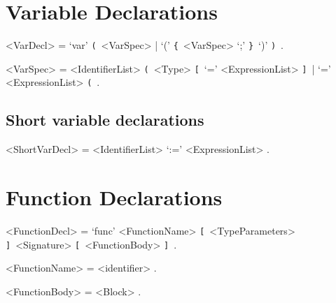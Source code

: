 \documentclass{article}
\def\lrep{\synshortsoff\texttt{\{}\synshorts~}
\def\rrep{\synshortsoff\texttt{\}}\synshorts~}
\def\lopt{\synshortsoff\texttt{[}\synshorts~}
\def\ropt{\synshortsoff\texttt{]}\synshorts~}
\def\lgrp{\synshortsoff\texttt{(}\synshorts~}
\def\rgrp{\synshortsoff\texttt{)}\synshorts~}
\begin{document}
\section{Variable Declarations} 
\begin{grammar} 
	<VarDecl> = `var' \lgrp <VarSpec> | `(' \lrep <VarSpec> `;' \rrep `)' \rgrp .

	<VarSpec> = <IdentifierList> \lgrp <Type> \lopt `=' <ExpressionList> \ropt | `=' <ExpressionList> \lgrp .

\end{grammar}

\subsection*{Short variable declarations}
\begin{grammar} 
	<ShortVarDecl> = <IdentifierList> `:=' <ExpressionList> .
\end{grammar}

\section*{Function Declarations} 
\begin{grammar} 
	<FunctionDecl> = `func' <FunctionName> \lopt <TypeParameters> \ropt <Signature> \lopt <FunctionBody> \ropt .
	
	<FunctionName> = <identifier> .
	
	<FunctionBody> = <Block> .
\end{grammar} 
\end{document}
